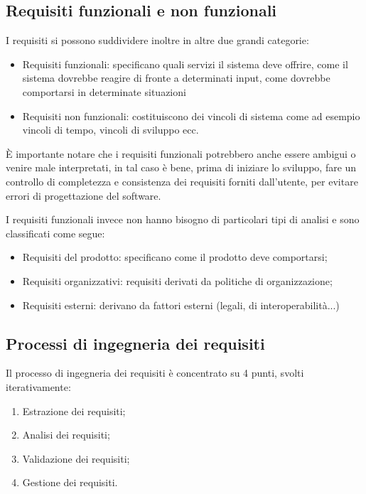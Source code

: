 \documentclass[a4paper, 10pt]{article}
\begin{document}
	\subsection{Requisiti funzionali e non funzionali}
	I requisiti si possono suddividere inoltre in altre due grandi categorie:
	\begin{itemize}
		\item Requisiti funzionali: specificano quali servizi il sistema deve offrire, come il sistema dovrebbe reagire di fronte a determinati input, come dovrebbe comportarsi in determinate situazioni
		
		\item Requisiti non funzionali: costituiscono dei vincoli di sistema come ad esempio vincoli di tempo, vincoli di sviluppo ecc.
	\end{itemize}

 	È importante notare che i requisiti funzionali potrebbero anche essere ambigui o venire male interpretati, in tal caso è bene, prima di iniziare lo sviluppo, fare un controllo di completezza e consistenza dei requisiti forniti dall'utente, per evitare errori di progettazione del software.
 	
 	I requisiti funzionali invece non hanno bisogno di particolari tipi di analisi e sono classificati come segue:
 	\begin{itemize}
 		\item Requisiti del prodotto: specificano come il prodotto deve comportarsi;
 		
 		\item Requisiti organizzativi: requisiti derivati da politiche di organizzazione;
 		
 		\item Requisiti esterni: derivano da fattori esterni (legali, di interoperabilità...)
 	\end{itemize}
 
 	\subsection{Processi di ingegneria dei requisiti}
 	Il processo di ingegneria dei requisiti è concentrato su 4 punti, svolti iterativamente:
 	\begin{enumerate}
 		\item Estrazione dei requisiti;
 		\item Analisi dei requisiti;
 		\item Validazione dei requisiti;
 		\item Gestione dei requisiti.
 	\end{enumerate}
	
\end{document}
